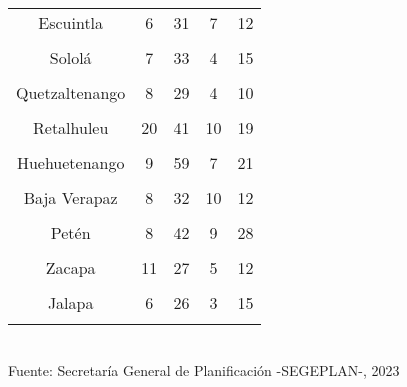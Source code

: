 \begin{tabular}[t]{ccccc}
Escuintla & 6 & 31 & 7 & 12\\
\cellcolor[HTML]{B6B3FF}{Santa Rosa} & \cellcolor[HTML]{B6B3FF}{5} & \cellcolor[HTML]{B6B3FF}{36} & \cellcolor[HTML]{B6B3FF}{5} & \cellcolor[HTML]{B6B3FF}{14}\\
Sololá & 7 & 33 & 4 & 15\\
\cellcolor[HTML]{B6B3FF}{Totonicapán} & \cellcolor[HTML]{B6B3FF}{3} & \cellcolor[HTML]{B6B3FF}{36} & \cellcolor[HTML]{B6B3FF}{6} & \cellcolor[HTML]{B6B3FF}{12}\\
Quetzaltenango & 8 & 29 & 4 & 10\\
\cellcolor[HTML]{B6B3FF}{Suchitepéquez} & \cellcolor[HTML]{B6B3FF}{14} & \cellcolor[HTML]{B6B3FF}{53} & \cellcolor[HTML]{B6B3FF}{15} & \cellcolor[HTML]{B6B3FF}{21}\\
Retalhuleu & 20 & 41 & 10 & 19\\
\cellcolor[HTML]{B6B3FF}{San Marcos} & \cellcolor[HTML]{B6B3FF}{5} & \cellcolor[HTML]{B6B3FF}{52} & \cellcolor[HTML]{B6B3FF}{2} & \cellcolor[HTML]{B6B3FF}{19}\\
Huehuetenango & 9 & 59 & 7 & 21\\
\cellcolor[HTML]{B6B3FF}{Quiché} & \cellcolor[HTML]{B6B3FF}{7} & \cellcolor[HTML]{B6B3FF}{42} & \cellcolor[HTML]{B6B3FF}{6} & \cellcolor[HTML]{B6B3FF}{19}\\
Baja Verapaz & 8 & 32 & 10 & 12\\
\cellcolor[HTML]{B6B3FF}{Alta Verapaz} & \cellcolor[HTML]{B6B3FF}{7} & \cellcolor[HTML]{B6B3FF}{36} & \cellcolor[HTML]{B6B3FF}{4} & \cellcolor[HTML]{B6B3FF}{17}\\
Petén & 8 & 42 & 9 & 28\\
\cellcolor[HTML]{B6B3FF}{Izabal} & \cellcolor[HTML]{B6B3FF}{8} & \cellcolor[HTML]{B6B3FF}{24} & \cellcolor[HTML]{B6B3FF}{7} & \cellcolor[HTML]{B6B3FF}{14}\\
Zacapa & 11 & 27 & 5 & 12\\
\cellcolor[HTML]{B6B3FF}{Chiquimula} & \cellcolor[HTML]{B6B3FF}{10} & \cellcolor[HTML]{B6B3FF}{27} & \cellcolor[HTML]{B6B3FF}{3} & \cellcolor[HTML]{B6B3FF}{15}\\
Jalapa & 6 & 26 & 3 & 15\\
\cellcolor[HTML]{B6B3FF}{Jutiapa} & \cellcolor[HTML]{B6B3FF}{8} & \cellcolor[HTML]{B6B3FF}{35} & \cellcolor[HTML]{B6B3FF}{4} & \cellcolor[HTML]{B6B3FF}{14}\\
\bottomrule
\end{tabular}
\\
Fuente: Secretaría General de Planificación -SEGEPLAN-, 2023
